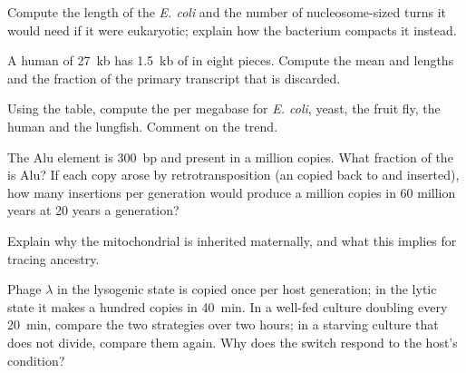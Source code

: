 \begin{exercise}[$\star\star$]\label{exo:b1:genomes:5}
Compute the length of the \emph{E. coli}  and the number of
nucleosome-sized turns it would need if it were eukaryotic; explain
how the bacterium compacts it instead.
\end{exercise}

\begin{exercise}[$\star\star$]\label{exo:b1:genomes:6}
A human  of \qty{27}{kb} has \qty{1.5}{kb} of  in eight
pieces. Compute the mean  and  lengths and the fraction of
the primary transcript that is discarded.
\end{exercise}

\begin{exercise}[$\star\star$]\label{exo:b1:genomes:7}
Using the table, compute the  per megabase for \emph{E. coli},
yeast, the fruit fly, the human and the lungfish. Comment on the trend.
\end{exercise}

\begin{exercise}[$\star\star$]\label{exo:b1:genomes:8}
The Alu element is \qty{300}{bp} and present in a million copies.
What fraction of the  is Alu? If each copy arose by
retrotransposition (an  copied back to  and inserted), how many
insertions per generation would produce a million copies in
\num{60} million years at \num{20} years a generation?
\end{exercise}

\begin{exercise}[$\star\star$]\label{exo:b1:genomes:9}
Explain why the mitochondrial  is inherited maternally, and
what this implies for tracing ancestry.
\end{exercise}

\begin{exercise}[$\star\star\star$]\label{exo:b1:genomes:10}
Phage $\lambda$ in the lysogenic state is copied once per host
generation; in the lytic state it makes a hundred copies in
\qty{40}{min}. In a well-fed culture doubling every \qty{20}{min},
compare the two strategies over two hours; in a starving culture that
does not divide, compare them again. Why does the switch respond to
the host's condition?
\end{exercise}

